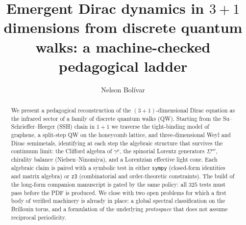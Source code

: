 \documentclass[a4paper,onecolumn,11pt]{quantumarticle}
\begin{document}
\title{Emergent Dirac dynamics in \texorpdfstring{$3{+}1$}{(3+1)} dimensions
       from discrete quantum walks: a machine-checked pedagogical ladder}

\author{Nelson Bol\'ivar}

\maketitle

\begin{abstract}
We present a pedagogical reconstruction of the $(3{+}1)$-dimensional Dirac
equation as the infrared sector of a family of discrete quantum walks (QW).
Starting from the Su--Schrieffer--Heeger (SSH) chain in $1{+}1$ we traverse
the tight-binding model of graphene, a split-step QW on the honeycomb
lattice, and three-dimensional Weyl and Dirac semimetals, identifying at
each step the algebraic structure that survives the continuum limit: the
Clifford algebra of $\gamma^{\mu}$, the spinorial Lorentz generators
$\Sigma^{\mu\nu}$, chirality balance (Nielsen--Ninomiya), and a Lorentzian
effective light cone. Each algebraic claim is paired with a symbolic test
in either \texttt{sympy} (closed-form identities and matrix algebra) or
\texttt{z3} (combinatorial and order-theoretic constraints). The
build of the long-form companion manuscript is gated by the same
policy: all $325$ tests must pass before the PDF is produced. We close
with two open problems for which a first body of verified machinery is
already in place: a global spectral classification on the Brillouin
torus, and a formulation of the underlying \emph{protospace} that does
not assume reciprocal periodicity.
\end{abstract}















\end{document}
